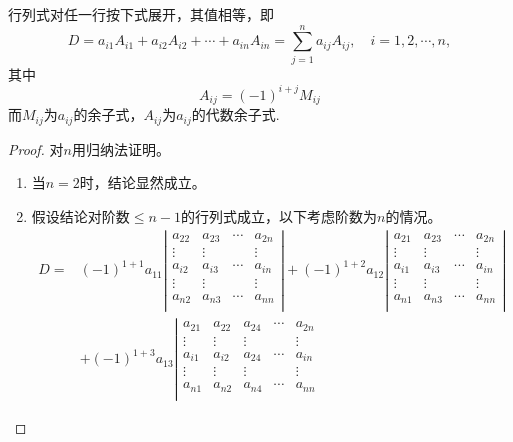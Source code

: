 \documentclass[10pt,a4paper%
tablecaptionabove]{article}
\begin{document}
\begin{CJK}{UTF8}{gkai}
  \begin{xingzhi}
    行列式对任一行按下式展开，其值相等，即
    $$
    D = a_{i1} A_{i1} + a_{i2} A_{i2} + \cdots + a_{in}A_{in} = \sum_{j=1}^n a_{ij} A_{ij}, \quad
    i = 1, 2, \cdots, n,
    $$
    其中
    $$
    A_{ij} = (-1)^{i+j} M_{ij}
    $$
    而$M_{ij}$为$a_{ij}$的余子式，$A_{ij}$为$a_{ij}$的代数余子式.
  \end{xingzhi}
  \begin{proof}
    对$n$用归纳法证明。
    \begin{enumerate}
    \item 当$n=2$时，结论显然成立。
    \item 假设结论对阶数$\le n-1$的行列式成立，以下考虑阶数为$n$的情况。
      $$
      \begin{aligned}
        D = &  (-1)^{1+1} a_{11} \left|
          \begin{array}{cccc}
            a_{22}  & a_{23}   & \cdots & a_{2n}\\
            \vdots  & \vdots & & \vdots \\
            a_{i2}  & a_{i3}   & \cdots & a_{in}\\
            \vdots & \vdots  & & \vdots \\
            a_{n2}  & a_{n3}   & \cdots & a_{nn}\\
          \end{array}
        \right| + (-1)^{1+2} a_{12} \left|
          \begin{array}{cccc}
            a_{21}  & a_{23}  & \cdots & a_{2n}\\
            \vdots & \vdots & & \vdots \\
            a_{i1}  & a_{i3}  & \cdots & a_{in}\\
            \vdots & \vdots & & \vdots \\
            a_{n1}  & a_{n3}  & \cdots & a_{nn}\\
          \end{array}
        \right|\\
        & + (-1)^{1+3} a_{13} \left|
          \begin{array}{ccccc}
            a_{21}  & a_{22} & a_{24}  & \cdots & a_{2n}\\
            \vdots & \vdots & \vdots & & \vdots \\
            a_{i1}  & a_{i2} & a_{24}  & \cdots & a_{in}\\
            \vdots & \vdots & \vdots & & \vdots \\
            a_{n1}  & a_{n2}  & a_{n4} & \cdots & a_{nn}\\

\end{array}
\end{aligned}$$
\end{enumerate}
\end{proof}
\end{CJK}
\end{document}
